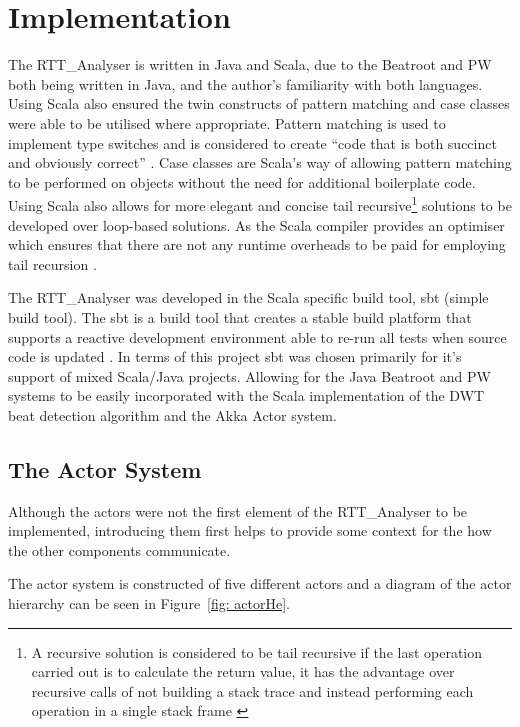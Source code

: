 \documentclass[a4paper, 11pt]{article}
\begin{document}
\maketitle{} \section{Implementation}
The RTT\_Analyser is written in Java and Scala, due to the Beatroot and PW both being written in Java, and the author's familiarity with both languages. Using Scala also ensured the twin constructs of pattern matching and case classes were able to be utilised where appropriate. Pattern matching is used to implement type switches and is considered to create ``code that is both succinct and obviously correct'' \cite{mariusEr}. Case classes are Scala's way of allowing pattern matching to be performed on objects without the need for additional boilerplate code. Using Scala also allows for more elegant and concise tail recursive\footnote{A recursive solution is considered to be tail recursive if the last operation carried out is to calculate the return value, it has the advantage over recursive calls of not building a stack trace and instead performing each operation in a single stack frame \cite{odesky}} solutions to be developed over loop-based solutions. As the Scala compiler provides an optimiser which ensures that there are not any runtime overheads to be paid for employing tail recursion \cite{odesky}.

The RTT\_Analyser was developed in the Scala specific build tool, sbt (simple build tool). The sbt is a build tool that creates a stable build platform that supports a reactive development environment able to re-run all tests when source code is updated \cite{sbt}. In terms of this project sbt was chosen primarily for it's support of mixed Scala/Java projects. Allowing for the Java Beatroot and PW systems to be easily incorporated with the Scala implementation of the DWT beat detection algorithm and the Akka Actor system.

\subsection{The Actor System}
Although the actors were not the first element of the RTT\_Analyser to be implemented, introducing them first helps to provide some context for the how the other components communicate.\par

The actor system is constructed of five different actors and a diagram of the actor hierarchy can be seen in Figure~\ref{fig: actorHe}. 
\end{document}
